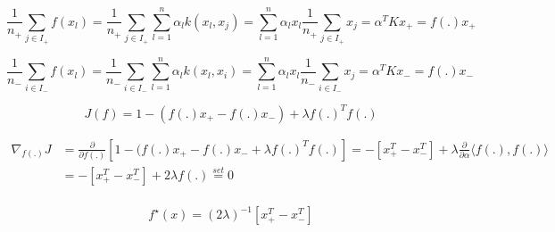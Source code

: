 \documentclass[11pt]{article}
\begin{document}
$$\frac{1}{n_+}\sum_{j \in I_+}f(x_l)=\frac{1}{n_+}\sum_{j \in I_+}\sum_{l=1}^n\alpha_l k(x_l,x_j)= \sum_{l=1}^n\alpha_l x_l\frac{1}{n_+}\sum_{j \in I_+}x_j=\alpha^T K x_+=f(.) x_+$$

$$\frac{1}{n_-}\sum_{i \in I_-}f(x_l)=\frac{1}{n_-}\sum_{i \in I_-}\sum_{l=1}^n\alpha_l k(x_l,x_i)= \sum_{l=1}^n\alpha_l x_l\frac{1}{n_-}\sum_{i \in I_-}x_j=\alpha^T K x_-=f(.) x_-$$


$$J(f)=1-(f(.) x_+-f(.) x_-)+ \lambda f(.)^T f(.)$$


\begin{align*}
\nabla_{f(.)} J&=\frac{\partial}{\partial f(.)}[1-(f(.) x_+-f(.) x_-+ \lambda f(.)^T f(.)]=-[x^T_+-x^T_-]+ \lambda \frac{\partial}{\partial\alpha}\langle f(.),f(.)\rangle\\
&=-[x^T_+-x^T_-]+ 2\lambda f(.)\overset{set}{=}0\\
\end{align*}

$$f^\star(x)=(2\lambda)^{-1} [x^T_+-x^T_-]$$
\end{document}
